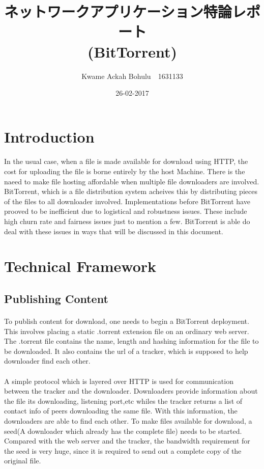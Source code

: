 \documentclass[24 pts]{article}
\title{ネットワークアプリケーション特論レポート\\(BitTorrent)}
\date{26-02-2017}
\author{Kwame Ackah Bohulu　1631133}
\begin{document}
\maketitle
\newpage
\section{Introduction}\paragraph{}
In the usual case, when a file is made available for download using HTTP, the cost for uploading the file is borne entirely by the host Machine. There is the naeed to make file hosting affordable when multiple file downloaders are involved. BitTorrent, which is a file distribution system acheives this by distributing pieces of the files to all downloader involved. Implementations before BitTorrent have prooved to be inefficient due to logistical and robustness issues. These include high churn rate and fairness issues just to mention a few. BitTorrent is able do deal with these issues in ways that will be discussed in this document.
\section{Technical Framework}

\subsection{Publishing Content}\paragraph{}
To publish content for download, one needs to begin a BitTorrent deployment. This involves placing a static .torrent extension file on an ordinary web server. The .torrent file contains the name, length and hashing information for the file to be downloaded. It also contains the url of a tracker, which is supposed to help downloader find each other. \paragraph{}A simple protocol which is layered over HTTP is used for communication between the tracker and the downloader. Downloaders provide information about the file its downloading, listening port,etc whiles the tracker returns a list of contact info of peers downloading the same file. With this information, the downloaders are able to find each other. To make files available for download, a seed(A downloader which already has the complete file) needs to be started. Compared with the web server and the tracker, the bandwidth requirement for the seed is very huge, since it is required to send out a complete copy of the original file.
\end{document}
